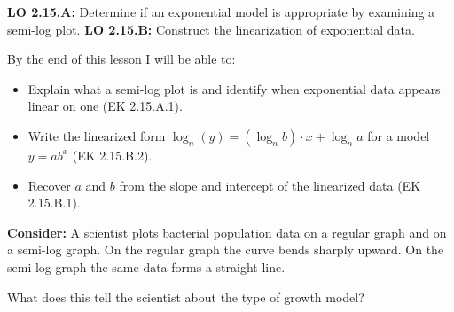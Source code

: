 \documentclass[10pt]{article}
\begin{document}
\namedateperiod

\vspace{0.1in}

\begin{objectivebox}
\textbf{LO 2.15.A:} Determine if an exponential model is appropriate by examining a
semi-log plot. \quad \textbf{LO 2.15.B:} Construct the linearization of exponential data.

By the end of this lesson I will be able to:
\begin{itemize}[leftmargin=1.5em,itemsep=3pt,topsep=3pt]
  \item Explain what a semi-log plot is and identify when exponential data appears linear
        on one (EK 2.15.A.1).
  \item Write the linearized form $\log_n(y) = (\log_n b)\cdot x + \log_n a$ for a model
        $y = ab^x$ (EK 2.15.B.2).
  \item Recover $a$ and $b$ from the slope and intercept of the linearized data (EK 2.15.B.1).
\end{itemize}
\end{objectivebox}

\vspace{0.08in}

\begin{vocabbox}




\end{vocabbox}

\vspace{0.08in}

\begin{hookbox}
\textbf{Consider:} A scientist plots bacterial population data on a regular graph and on a
semi-log graph.  On the regular graph the curve bends sharply upward.  On the semi-log graph
the same data forms a straight line.

\vspace{4pt}
What does this tell the scientist about the type of growth model? 
\end{hookbox}
\end{document}

